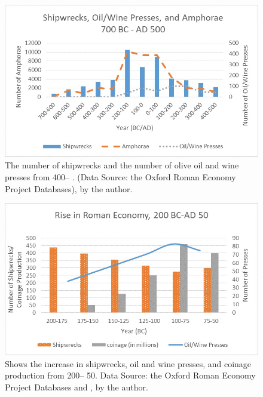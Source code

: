 	
	\begin{figure}[!p]
		\includegraphics[width=\linewidth]{figures/Davis_Agroeconomy_Fig4.jpg}
		\centering
		\caption{The number of shipwrecks and the number of olive oil and wine presses from 400\BC – . (Data Source: the Oxford Roman Economy Project Databases), by the author.}
		\label{fig:DavisFig4}
	\end{figure}
	
	\begin{figure}[!p]
		\includegraphics[width=\linewidth]{figures/Davis_Agroeconomy_Fig5.jpg}
		\centering
		\caption{Shows the increase in shipwrecks, oil and wine presses, and coinage production from 200\BC – 50\BC. Data Source: the Oxford Roman Economy Project Databases and \textcite{Hopkins_1980}, by the author.}
		\label{fig:DavisFig5}
	\end{figure}
	
